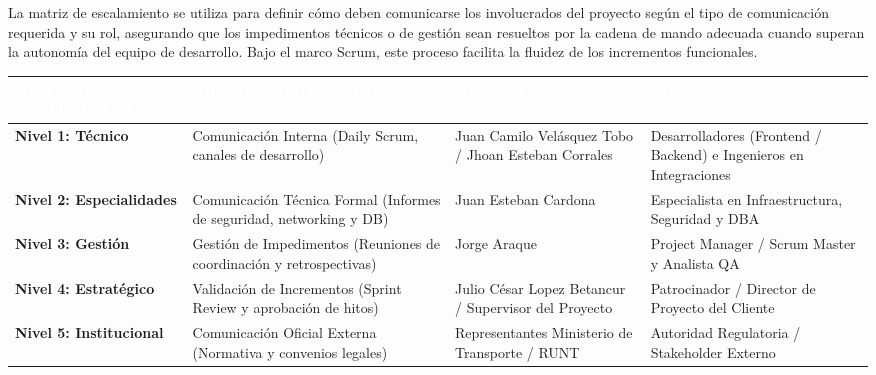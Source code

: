 La matriz de escalamiento se utiliza para definir cómo deben comunicarse los involucrados del proyecto según el tipo de comunicación requerida y su rol, asegurando que los impedimentos técnicos o de gestión sean resueltos por la cadena de mando adecuada cuando superan la autonomía del equipo de desarrollo. Bajo el marco Scrum, este proceso facilita la fluidez de los incrementos funcionales.

\begin{table}[H]
\centering
\scriptsize 
\setlength{\tabcolsep}{5pt}
\renewcommand{\arraystretch}{1.8}
\begin{tabular}{|p{2.8cm}|p{3.5cm}|p{4.2cm}|p{3.5cm}|}
\hline
\rowcolor[HTML]{003366} 
\textcolor{white}{\textbf{NIVEL DE ESCALAMIENTO}} & 
\textcolor{white}{\textbf{TIPO DE COMUNICACIÓN}} & 
\textcolor{white}{\textbf{NOMBRE}} & 
\textcolor{white}{\textbf{ROL}} \\ \hline

\textbf{Nivel 1: Técnico} & Comunicación Interna (Daily Scrum, canales de desarrollo) & Juan Camilo Velásquez Tobo / Jhoan Esteban Corrales & Desarrolladores (Frontend / Backend) e Ingenieros en Integraciones\\ \hline

\textbf{Nivel 2: Especialidades} & Comunicación Técnica Formal (Informes de seguridad, networking y DB) & Juan Esteban Cardona & Especialista en Infraestructura, Seguridad y DBA \\ \hline

\textbf{Nivel 3: Gestión} & Gestión de Impedimentos (Reuniones de coordinación y retrospectivas) & Jorge Araque & Project Manager / Scrum Master y  Analista QA\\ \hline

\textbf{Nivel 4: Estratégico} & Validación de Incrementos (Sprint Review y aprobación de hitos) & Julio César Lopez Betancur / Supervisor del Proyecto & Patrocinador / Director de Proyecto del Cliente \\ \hline

\textbf{Nivel 5: Institucional} & Comunicación Oficial Externa (Normativa y convenios legales) & Representantes Ministerio de Transporte / RUNT & Autoridad Regulatoria / Stakeholder Externo \\ \hline

\end{tabular}
\end{table}

